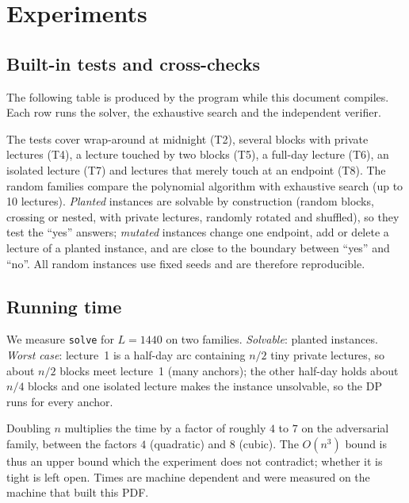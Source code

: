 \documentclass[11pt,a4paper]{article}
\theoremstyle{definition}
\theoremstyle{remark}
\begin{document}
\section{Experiments}\label{sec:exp}
\subsection{Built-in tests and cross-checks}
The following table is produced by the program while this document compiles.  Each row
runs the solver, the exhaustive search and the independent verifier.


The tests cover wrap-around at midnight (T2), several blocks with private lectures (T4),
a lecture touched by two blocks (T5), a full-day lecture (T6), an isolated lecture (T7)
and lectures that merely touch at an endpoint (T8).  The random families compare the
polynomial algorithm with exhaustive search (up to 10 lectures).  \emph{Planted}
instances are solvable by construction (random blocks, crossing or nested, with
private lectures, randomly rotated and shuffled), so they test the ``yes'' answers;
\emph{mutated} instances change one endpoint, add or delete a lecture of a planted
instance, and are close to the boundary between ``yes'' and ``no''.  All random
instances use fixed seeds and are therefore reproducible.

\subsection{Running time}
We measure \texttt{solve} for $L=1440$ on two families.  \emph{Solvable}: planted
instances.  \emph{Worst case}: lecture~1 is a half-day arc containing $n/2$ tiny private
lectures, so about $n/2$ blocks meet lecture~1 (many anchors); the other half-day holds
about $n/4$ blocks and one isolated lecture makes the instance unsolvable, so the DP
runs for every anchor.
\begin{center}
\end{center}
Doubling $n$ multiplies the time by a factor of roughly $4$ to $7$ on the adversarial family,
between the factors $4$ (quadratic) and $8$ (cubic).  The $O(n^3)$ bound is thus an upper bound
which the experiment does not contradict; whether it is tight is left open.  Times are
machine dependent and were measured on the machine that built this PDF.
\end{document}
